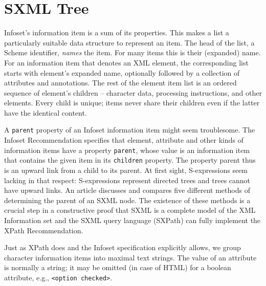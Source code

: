 \documentclass[10pt]{article}
\begin{document}
\section{SXML Tree}
Infoset's information item is a sum of its properties. This makes
a list a particularly suitable data structure to represent an
item. The head of the list, a Scheme identifier, \emph{names} the
item. For many items this is their (expanded) name. For an information
item that denotes an XML element, the corresponding list starts with
element's expanded name, optionally followed by a collection of
attributes and annotations. The rest of the element item list
is an ordered sequence of element's children -- character data,
processing instructions, and other elements. Every child is unique;
items never share their children even if the latter have the identical
content.

A \texttt{parent} property of an Infoset information item
might seem troublesome. The Infoset Recommendation \cite{XML Infoset} specifies that element, attribute and other kinds of
information items have a property \texttt{parent}, whose value is
an information item that contains the given item in its \texttt{children} property. The property parent thus is an upward link
from a child to its parent. At first sight, S-expressions seem lacking
in that respect: S-expressions represent directed trees and trees
cannot have upward links. An article \cite{Parent-pointers}
discusses and compares five different methods of determining the
parent of an SXML node. The existence of these methods is a crucial
step in a constructive proof that SXML is a complete model of the XML
Information set and the SXML query language (SXPath) can fully
implement the XPath Recommendation.

Just as XPath does and the Infoset specification explicitly allows,
we group character information items into maximal text strings.  The
value of an attribute is normally a string; it may be omitted (in
case of HTML) for a boolean attribute, e.g., \texttt{<option checked>}.
\end{document}
